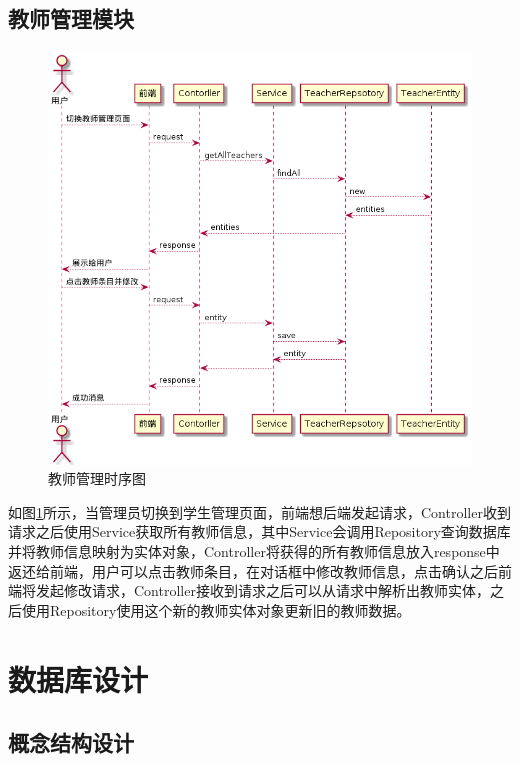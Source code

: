 \subsection{教师管理模块}

\begin{figure}
    \centering
    \includegraphics[scale = 0.6]{out/uml/时序图/manage-teacher-sequence/manage-teacher-sequence.png}
    \caption{\song\wuhao 教师管理时序图}
    \label{manage-teacher-sequence}
\end{figure}

如图\ref{manage-teacher-sequence}所示，当管理员切换到学生管理页面，前端想后端发起请求，Controller收到请求之后使用Service获取所有教师信息，其中Service会调用Repository查询数据库并将教师信息映射为实体对象，Controller将获得的所有教师信息放入response中返还给前端，用户可以点击教师条目，在对话框中修改教师信息，点击确认之后前端将发起修改请求，Controller接收到请求之后可以从请求中解析出教师实体，之后使用Repository使用这个新的教师实体对象更新旧的教师数据。

\section{数据库设计}
\subsection{概念结构设计}

